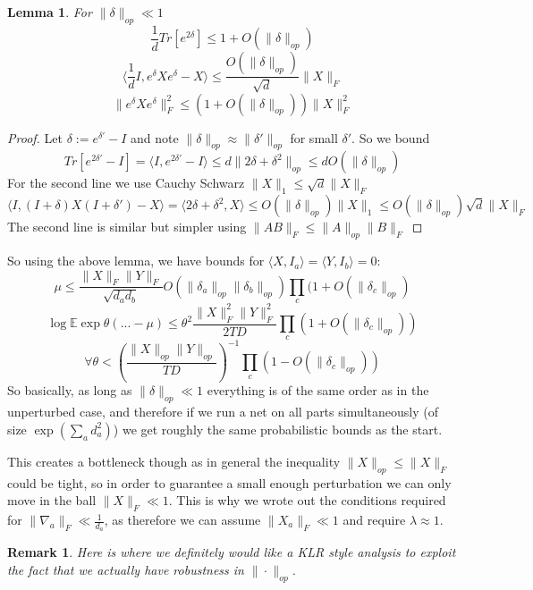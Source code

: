 \documentclass{article}
\newtheorem{lemma}[theorem]{Lemma}
\newtheorem{remark}{Remark}
\newcommand{\E}{\mathbb{E}}
\begin{document}
\begin{lemma}
For $\|\delta\|_{op} \ll 1$
\[ \frac{1}{d} Tr[e^{2\delta}] \leq 1 + O(\|\delta\|_{op})  \]
\[ \langle \frac{1}{d} I, e^{\delta} X e^{\delta} - X \rangle \leq \frac{O(\|\delta\|_{op})}{\sqrt{d}} \|X\|_{F}   \]
\[ \|e^{\delta} X e^{\delta}\|_{F}^{2} \leq (1 + O(\|\delta\|_{op})) \|X\|_{F}^{2}   \]
\end{lemma}
\begin{proof}
Let $\delta := e^{\delta'} - I$ and note $\|\delta\|_{op} \approx \|\delta'\|_{op}$ for small $\delta'$. So we bound
\[ Tr[e^{2\delta'} - I] = \langle I, e^{2\delta'} - I \rangle \leq d \|2\delta + \delta^{2}\|_{op} \leq d O(\|\delta\|_{op})   \]
For the second line we use Cauchy Schwarz $\|X\|_{1} \leq \sqrt{d} \|X\|_{F}$
\[ \langle I, (I + \delta) X (I + \delta') - X \rangle = \langle 2 \delta + \delta^{2}, X \rangle \leq O(\|\delta\|_{op}) \|X\|_{1} \leq O(\|\delta\|_{op}) \sqrt{d} \|X\|_{F}  \]
The second line is similar but simpler using $\|AB\|_{F} \leq \|A\|_{op} \|B\|_{F}$
\end{proof}

So using the above lemma, we have bounds for $\langle X, I_{a} \rangle = \langle Y, I_{b} \rangle = 0$:
\[ \mu \leq \frac{\|X\|_{F} \|Y\|_{F}}{\sqrt{d_{a} d_{b}}} O(\|\delta_{a}\|_{op} \|\delta_{b}\|_{op}) \prod_{c} (1 + O(\|\delta_{c}\|_{op})  \]
\[ \log \E \exp \theta (... - \mu) \leq \theta^{2} \frac{\|X\|_{F}^{2} \|Y\|_{F}^{2}}{2TD} \prod_{c} (1 + O(\|\delta_{c}\|_{op}))  \]
\[ \forall \theta < \left( \frac{\|X\|_{op}\|Y\|_{op}}{TD} \right)^{-1} \prod_{c} (1 - O(\|\delta_{c}\|_{op}))  \]
So basically, as long as $\|\delta\|_{op} \ll 1$ everything is of the same order as in the unperturbed case, and therefore if we run a net on all parts simultaneously (of size $\exp(\sum_{a} d_{a}^{2})$) we get roughly the same probabilistic bounds as the start. 

This creates a bottleneck though as in general the inequality $\|X\|_{op} \leq \|X\|_{F}$ could be tight, so in order to guarantee a small enough perturbation we can only move in the ball $\|X\|_{F} \ll 1$. This is why we wrote out the conditions required for $\|\nabla_{a}\|_{F} \ll \frac{1}{d_{a}}$, as therefore we can assume $\|X_{a}\|_{F} \ll 1$ and require $\lambda \approx 1$. 

\begin{remark}
Here is where we definitely would like a KLR style analysis to exploit the fact that we actually have robustness in $\|\cdot\|_{op}$. 
\end{remark}
\end{document}
